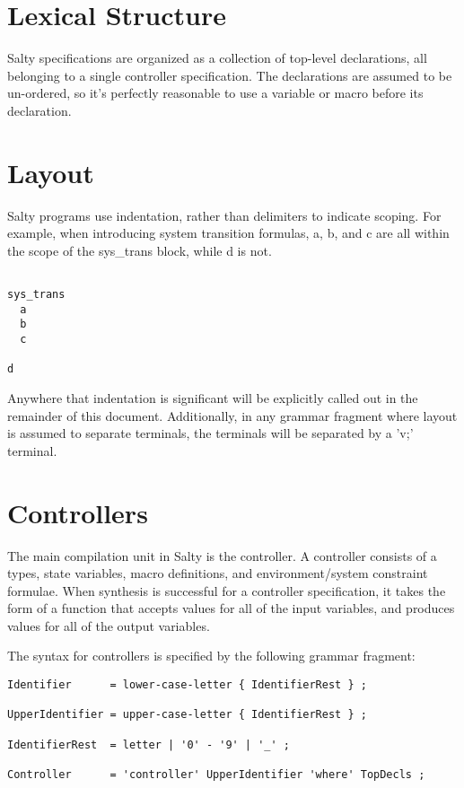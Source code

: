 
\section{Lexical Structure}

Salty specifications are organized as a collection of top-level declarations, all belonging to a single controller specification. The declarations are assumed to be un-ordered, so it's perfectly reasonable to use a variable or macro before its declaration.


\section{Layout}

Salty programs use indentation, rather than delimiters to indicate scoping. For example, when introducing system transition formulas, a, b, and c are all within the scope of the sys\_trans block, while d is not.

\begin{lstlisting}

sys_trans
  a
  b
  c

d

\end{lstlisting}

Anywhere that indentation is significant will be explicitly called out in the remainder of this document. Additionally, in any grammar fragment where layout is assumed to separate terminals, the terminals will be separated by a 'v;' terminal.

\section{Controllers}

The main compilation unit in Salty is the controller. A controller consists of a types, state variables, macro definitions, and environment/system constraint formulae. When synthesis is successful for a controller specification, it takes the form of a function that accepts values for all of the input variables, and produces values for all of the output variables.

\noindent The syntax for controllers is specified by the following grammar fragment:

\begin{lstlisting}
Identifier      = lower-case-letter { IdentifierRest } ;

UpperIdentifier = upper-case-letter { IdentifierRest } ;

IdentifierRest  = letter | '0' - '9' | '_' ;

Controller      = 'controller' UpperIdentifier 'where' TopDecls ;
\end{lstlisting}


